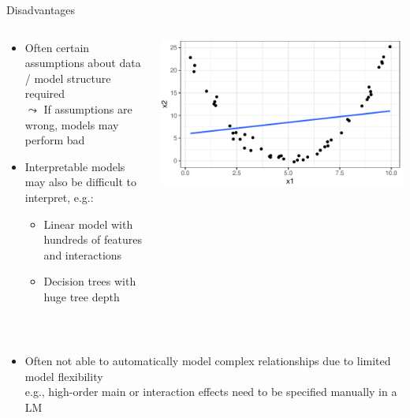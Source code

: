 \documentclass[11pt,compress,t,notes=noshow, aspectratio=169, xcolor=table]{beamer}
\begin{document}
\begin{frame}{Disadvantages}
\begin{columns}
\begin{column}{0.72\textwidth}
    \begin{itemize}%
    \itemsep1em
        \item<1-> Often certain assumptions about data / model structure required\\
        $\leadsto$ If assumptions are wrong, models may perform bad 
        \item<2-> Interpretable models may also be difficult to interpret, e.g.:
    \begin{itemize}
        \item Linear model with hundreds of features and interactions 
        \item Decision trees with huge tree depth
    \end{itemize}
    \end{itemize}
\end{column}
\begin{column}{0.28\textwidth}
    \begin{center}
        \includegraphics[width = \textwidth]{figure/lm_bad_fit.pdf} 
    \end{center}
\end{column}
\end{columns}
\quad \\

\begin{itemize}
\itemsep1em
        \item<3-> 
        Often not able to automatically model complex relationships due to limited model flexibility
        \\
        e.g., high-order main or interaction effects need to be specified manually in a LM


\end{itemize}
\end{frame}
\end{document}
